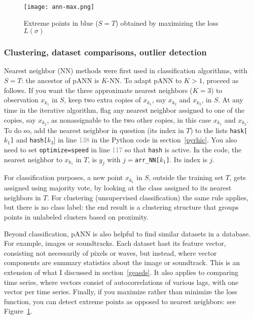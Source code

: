 \documentclass[oneside,10pt]{book}
\begin{document}
\begin{figure}[H]
\centering
\texttt{[image: ann-max.png]}
\caption{Extreme points in blue ($S=T$) obtained by maximizing the loss $L(\sigma)$}
\label{fig:z0m4rlp9ut}
\end{figure}

\subsubsection{Clustering, dataset comparisons, outlier detection}\label{bodong}

Nearest neighbor (NN) methods were first used in classification algorithms, with $S=T$: the ancestor of pANN is $K$-NN. 
To adapt pANN to $K>1$, proceed as follows. If you want the three approximate nearest neighbors ($K=3$) to observation 
$x_{k_1}$ in $S$, keep two extra copies of $x_{k_1}$,
 say $x_{k_2}$ and $x_{k_3}$, in $S$. At any time in the iterative algorithm, flag any nearest neighbor assigned to one of the copies,  say $x_{k_2}$, as nonassignable to the two other copies, in this case $x_{k_1}$ and $x_{k_3}$. To do so, 
 add the nearest neighbor in question (its index in $T$) 
to the lists \texttt{hask[$k_1$]} and \texttt{hash[$k_3]$} in line \textcolor{gray}{138} in the Python code
 in section~\ref{pyrhic}. You also need to set \texttt{optimize=\textquotesingle speed\textquotesingle} in line \textcolor{gray}{117} so that \texttt{hash} is active. 
In the code, the nearest neighbor to $x_{k_1}$ in $T$, is $y_j$ with $j=$\texttt{arr\_NN[$k_1$]}. Its index is $j$.

For classification purposes, a new point $x_{k_1}$ in $S$, outside the training set $T$, gets assigned using majority vote, by looking at the class assigned to its nearest neighbors in $T$. For clustering (unsupervised classification) the same rule applies, but there is no class label: the end result is a clustering structure that groups points in unlabeled clusters based on proximity. 

Beyond classification, pANN is also helpful to find similar datasets in a database. For example, images 
 or soundtracks. Each dataset hast its feature vector, consisting not necessarily of pixels or waves, but  instead, where 
vector components are summary statistics about the image or soundtrack. 
 This is an extension of what I discussed in section~\ref{geasds}. It also applies to comparing time series, where 
vectors consist of autocorrelations of various lags, with one vector per time series.   
Finally, if you maximize rather than minimize the loss function, you can detect extreme points as opposed to nearest neighbors: see Figure~\ref{fig:z0m4rlp9ut}.
\end{document}
